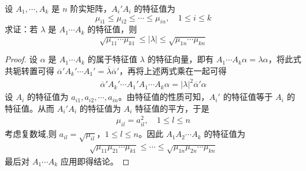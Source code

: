 \documentclass[../../main.tex]{subfiles}
\begin{document}
\begin{example}\label{example:例9.56}
设 \(A_1,\cdots,A_k\) 是 \(n\) 阶实矩阵，\(A_i'A_i\) 的特征值为
\[
\mu_{i1} \leq \mu_{i2} \leq \cdots \leq \mu_{in},\quad 1\leq i \leq k
\]
求证：若 \(\lambda\) 是 \(A_1\cdots A_k\) 的特征值，则
\[
\sqrt{\mu_{11}\cdots\mu_{k1}} \leq |\lambda| \leq \sqrt{\mu_{1n}\cdots\mu_{kn}}
\]
\end{example}
\begin{proof}
设 \(\alpha\) 是 \(A_1\cdots A_k\) 的属于特征值 \(\lambda\) 的特征向量，即有 \(A_1\cdots A_k\alpha = \lambda\alpha\)，将此式共轭转置可得 \(\overline{\alpha}'A_k'\cdots A_1' = \overline{\lambda}\overline{\alpha}'\)，再将上述两式乘在一起可得
\begin{align*}
\overline{\alpha}'A_k'\cdots A_1'A_1\cdots A_k\alpha = |\lambda|^2\overline{\alpha}'\alpha
\end{align*}
设 \(A_i\) 的特征值为 \(a_{i1},a_{i2},\cdots,a_{in}\)。由特征值的性质可知，\(A_i'\) 的特征值等于 \(A_i\) 的特征值。从而 \(A_i'A_i\) 的特征值为 \(A_i\) 特征值的平方，于是
\begin{align*}
\mu_{il} = a_{il}^2,\quad 1\leq l \leq n
\end{align*}
考虑复数域,则 \(a_{il} = \sqrt{\mu_{il}}\)，\(1\leq l \leq n\)。因此 \(A_1A_2\cdots A_k\) 的特征值为
\begin{align*}
\sqrt{\mu_{11}\mu_{21}\cdots\mu_{k1}} \leq \cdots \leq \sqrt{\mu_{1n}\mu_{2n}\cdots\mu_{kn}}
\end{align*}
最后对 \(A_1\cdots A_k\) 应用即得结论。 
\end{proof}
\end{document}
